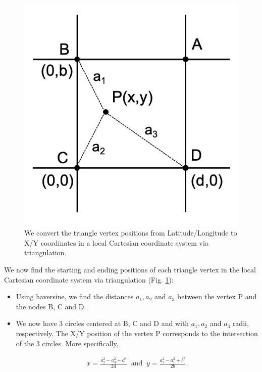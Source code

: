 \documentclass[draft]{agujournal2018}
\begin{document}
\begin{figure}[h]
 \begin{center}
   \includegraphics[scale=.6]{figures/triangulation.png}
 \end{center}
 \caption{ We convert the triangle vertex positions from Latitude/Longitude to X/Y coordinates in a local Cartesian coordinate system via triangulation.}
 \label{triangulation}
\end{figure}

We now find the starting and ending positions of each triangle vertex in the local Cartesian coordinate system via triangulation (Fig. \ref{triangulation}):

\begin{itemize}
    
    \item Using haversine, we find the distances $a_1, a_2$ and $a_3$ between the vertex P and the nodes B, C and D. 
    
    \item We now have 3 circles centered at B, C and D and with $a_1, a_2$ and $a_3$ radii, respectively. The X/Y position of the vertex P corresponds to the intersection of the 3 circles. More specifically,
    
\begin{align}
    x = \frac{a_2^2-a_3^2+d^2}{2d} \;\; \text{and} \;\;
    y = \frac{a_2^2-a_1^2+b^2}{2b}.
\end{align}
  
\end{itemize}
\end{document}

